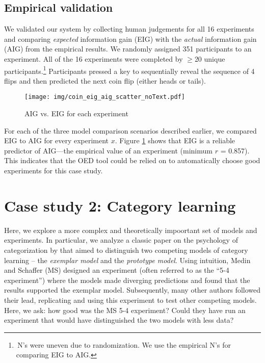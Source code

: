 \documentclass[10pt,letterpaper]{article}
\begin{document}
\subsection{Empirical validation}
We validated our system by collecting human judgements for all 16 experiments and comparing \emph{expected} information gain (EIG) with the \emph{actual} information gain (AIG) from the empirical results.
We randomly assigned 351 participants to an experiment.
All of the 16 experiments were completed by $\geq$20 unique participants.\footnote{\,N's were uneven due to randomization. We use the empirical N's for comparing EIG to AIG.}
Participants pressed a key to sequentially reveal the sequence of 4 flips and then predicted the next coin flip (either heads or tails).

\begin{figure}[t]
 \texttt{[image: img/coin\_eig\_aig\_scatter\_noText.pdf]}
 \caption{AIG vs. EIG for each experiment}
  \label{fig:aig_vs_eig}
\end{figure}

For each of the three model comparison scenarios described earlier, we compared EIG to AIG for every experiment $x$.
Figure \ref{fig:aig_vs_eig} shows that EIG is a reliable predictor of AIG---the empirical value of an experiment (minimum $r$ = 0.857). This indicates that the OED tool could be relied on to automatically choose good experiments for this case study.


\section{Case study 2: Category learning}

Here, we explore a more complex and theoretically impoortant set of models and experiments.
In particular, we analyze a classic paper on the psychology of categorization by \cite{medin78:pr} that aimed to distinguish two competing models of category learning -- the \emph{exemplar model} and the \emph{prototype model}.
Using intuition, Medin and Schaffer (MS) designed an experiment (often referred to as the ``5-4 experiment'') where the models made diverging predictions and found that the results supported the exemplar model.
Subsequently, many other authors followed their lead, replicating and using this experiment to test other competing models.
Here, we ask: how good was the MS 5-4 experiment?
Could they have run an experiment that would have distinguished the two models with less data?
\end{document}
